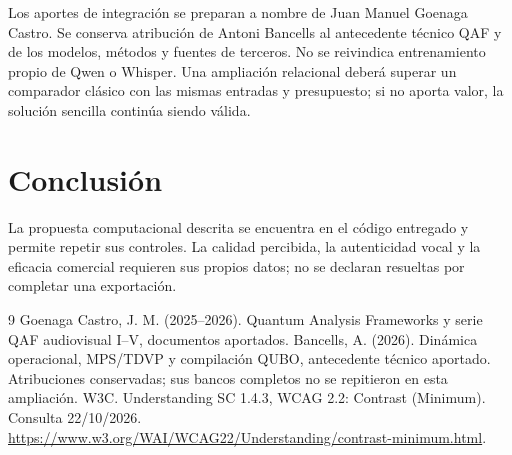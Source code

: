 \documentclass[10pt,a4paper]{article}
\begin{document}
Los aportes de integración se preparan a nombre de Juan Manuel Goenaga Castro. Se conserva atribución de Antoni Bancells al antecedente técnico QAF y de los modelos, métodos y fuentes de terceros. No se reivindica entrenamiento propio de Qwen o Whisper. Una ampliación relacional deberá superar un comparador clásico con las mismas entradas y presupuesto; si no aporta valor, la solución sencilla continúa siendo válida.
\section{Conclusión}
La propuesta computacional descrita se encuentra en el código entregado y permite repetir sus controles. La calidad percibida, la autenticidad vocal y la eficacia comercial requieren sus propios datos; no se declaran resueltas por completar una exportación.
\begin{thebibliography}{9}
 Goenaga Castro, J. M. (2025--2026). Quantum Analysis Frameworks y serie QAF audiovisual I--V, documentos aportados. Bancells, A. (2026). Dinámica operacional, MPS/TDVP y compilación QUBO, antecedente técnico aportado. Atribuciones conservadas; sus bancos completos no se repitieron en esta ampliación.
 W3C. Understanding SC 1.4.3, WCAG 2.2: Contrast (Minimum). Consulta 22/10/2026. \url{https://www.w3.org/WAI/WCAG22/Understanding/contrast-minimum.html}.
\end{thebibliography}
\end{document}
